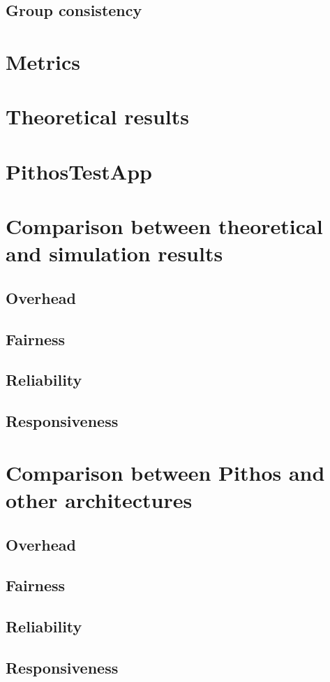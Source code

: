         \subsection{Group consistency}

    \section{Metrics}

    \section{Theoretical results}

    \section{PithosTestApp}

    \section{Comparison between theoretical and simulation results}

        \subsection{Overhead}
        \subsection{Fairness}
        \subsection{Reliability}
        \subsection{Responsiveness}

    \section{Comparison between Pithos and other architectures}

        \subsection{Overhead}
        \subsection{Fairness}
        \subsection{Reliability}
        \subsection{Responsiveness}
